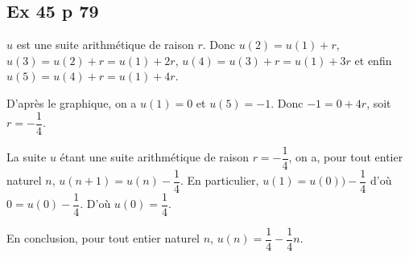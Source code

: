 \documentclass[12pt,a4paper]{book}
\begin{document}
\subsection*{Ex 45 p 79}

$u$ est une suite arithmétique de raison $r$. Donc $u\left(2\right) = u\left( 1 \right)+r$, $u\left(3\right) = u\left(2\right) + r = u\left(1\right) +2r$, $u\left(4\right) = u\left(3\right) + r = u\left(1\right)+3r$ et enfin $u\left(5\right) = u\left(4\right)+r = u\left(1\right)+4r$. 

D’après le graphique, on a $u\left(1\right)=0$ et $u\left(5\right)=-1$. Donc $-1= 0+4r$, soit $r=-\dfrac{1}{4}$.

La suite $u$ étant une suite arithmétique de raison $r=-\dfrac{1}{4}$, on a, pour tout entier naturel $n$, $u\left(n+1\right)=u\left(n\right)-\dfrac{1}{4}$. En particulier, $u\left(1\right)=u\left(0\right))-\dfrac{1}{4}$ d’où $0 = u\left(0\right)-\dfrac{1}{4}$. D’où $u\left(0\right) = \dfrac{1}{4}$.

En conclusion, pour tout entier naturel $n$, $u\left(n\right) = \dfrac{1}{4}-\dfrac{1}{4}n$.
\end{document}
